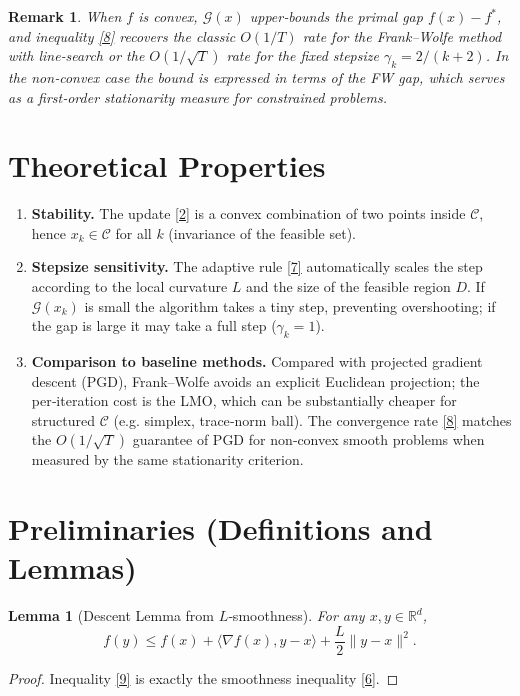 \documentclass[11pt]{article}
\newtheorem{lemma}{Lemma}[section]
\newtheorem{remark}{Remark}[section]
\begin{document}
\begin{remark}
When $f$ is convex, $\mathcal G(x)$ upper‑bounds the primal gap
$f(x)-f^{*}$, and inequality \eqref{8} recovers the classic $O(1/T)$ rate for
the Frank–Wolfe method with line‑search or the $O(1/\sqrt{T})$ rate for the
fixed stepsize $\gamma_{k}=2/(k+2)$.  In the non‑convex case the bound is
expressed in terms of the FW gap, which serves as a first‑order stationarity
measure for constrained problems.
\end{remark}

\section{Theoretical Properties}
\label{sec:properties}
\begin{enumerate}
\item \textbf{Stability.}  
   The update \eqref{2} is a convex combination of two points inside
   $\mathcal C$, hence $x_{k}\in\mathcal C$ for all $k$ (invariance of the
   feasible set).

\item \textbf{Stepsize sensitivity.}  
   The adaptive rule \eqref{7} automatically scales the step according to the
   local curvature $L$ and the size of the feasible region $D$.  If
   $\mathcal G(x_{k})$ is small the algorithm takes a tiny step, preventing
   overshooting; if the gap is large it may take a full step ($\gamma_{k}=1$).

\item \textbf{Comparison to baseline methods.}  
   Compared with projected gradient descent (PGD), Frank–Wolfe avoids an
   explicit Euclidean projection; the per‑iteration cost is the LMO,
   which can be substantially cheaper for structured $\mathcal C$ (e.g.
   simplex, trace‑norm ball).  The convergence rate \eqref{8} matches the
   $O(1/\sqrt{T})$ guarantee of PGD for non‑convex smooth problems when
   measured by the same stationarity criterion.
\end{enumerate}

\section{Preliminaries (Definitions and Lemmas)}
\label{sec:prelim}
\begin{lemma}[Descent Lemma from $L$‑smoothness]
\label{lem:descent}
For any $x,y\in\mathbb{R}^{d}$,
\[
f(y) \le f(x) + \langle\nabla f(x),y-x\rangle + \frac{L}{2}\|y-x\|^{2}.
\tag{9}
\]
\end{lemma}
\begin{proof}
Inequality \eqref{9} is exactly the smoothness inequality \eqref{6}.
\end{proof}
\end{document}
